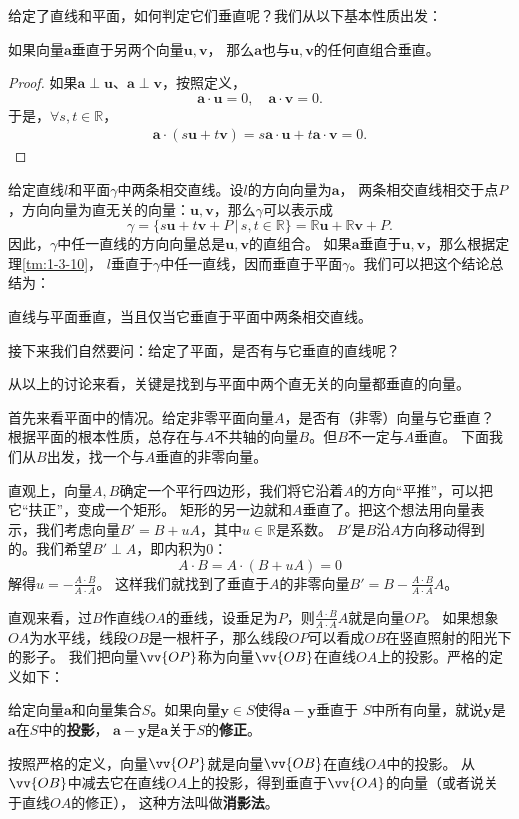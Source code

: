 \documentclass[12pt,UTF8,fontset=none]{ctexbook}
\begin{document}
给定了直线和平面，如何判定它们垂直呢？我们从以下基本性质出发：
\begin{tm}\label{tm:1-3-10}
    如果向量$\mathbf{a}$垂直于另两个向量$\mathbf{u},\mathbf{v}$，
    那么$\mathbf{a}$也与$\mathbf{u},\mathbf{v}$的任何直组合垂直。
\end{tm}
\begin{proof}
    如果$\mathbf{a}\perp \mathbf{u}$、$\mathbf{a}\perp \mathbf{v}$，按照定义，
    $$ \mathbf{a}\cdot \mathbf{u} = 0, \quad \mathbf{a}\cdot \mathbf{v} = 0. $$
    于是，$\forall s, t\in\mathbb{R}$，
    \begin{align*}
        \mathbf{a}\cdot (s\mathbf{u} + t\mathbf{v}) = s\mathbf{a}\cdot \mathbf{u} + t\mathbf{a}\cdot \mathbf{v} = 0. 
    \end{align*}
\end{proof}

给定直线$l$和平面$\gamma$中两条相交直线。设$l$的方向向量为$\mathbf{a}$，
两条相交直线相交于点$P$，方向向量为直无关的向量：$\mathbf{u},\mathbf{v}$，那么$\gamma$可以表示成
$$ \gamma = \{s\mathbf{u} + t\mathbf{v} + P \, | \, s,t\in\mathbb{R}\} = \mathbb{R}\mathbf{u} + \mathbb{R}\mathbf{v} + P. $$
因此，$\gamma$中任一直线的方向向量总是$\mathbf{u},\mathbf{v}$的直组合。
如果$\mathbf{a}$垂直于$\mathbf{u},\mathbf{v}$，那么根据定理\ref{tm:1-3-10}，
$l$垂直于$\gamma$中任一直线，因而垂直于平面$\gamma$。我们可以把这个结论总结为：
\begin{tm}\label{tm:1-3-20}
    直线与平面垂直，当且仅当它垂直于平面中两条相交直线。
\end{tm}
接下来我们自然要问：给定了平面，是否有与它垂直的直线呢？

从以上的讨论来看，关键是找到与平面中两个直无关的向量都垂直的向量。

首先来看平面中的情况。给定非零平面向量$A$，是否有（非零）向量与它垂直？
根据平面的根本性质，总存在与$A$不共轴的向量$B$。但$B$不一定与$A$垂直。
下面我们从$B$出发，找一个与$A$垂直的非零向量。

直观上，向量$A,B$确定一个平行四边形，我们将它沿着$A$的方向“平推”，可以把它“扶正”，变成一个矩形。
矩形的另一边就和$A$垂直了。把这个想法用向量表示，我们考虑向量$B' = B + uA$，其中$u\in\mathbb{R}$是系数。
$B'$是$B$沿$A$方向移动得到的。我们希望$B'\perp A$，即内积为$0$：
$$ A\cdot B = A\cdot (B + uA) = 0$$
解得$u = -\frac{A\cdot B}{A\cdot A}$。
这样我们就找到了垂直于$A$的非零向量$B' = B -\frac{A\cdot B}{A\cdot A}A$。

直观来看，过$B$作直线$OA$的垂线，设垂足为$P$，则$\frac{A\cdot B}{A\cdot A}A$就是向量$OP$。
如果想象$OA$为水平线，线段$OB$是一根杆子，那么线段$OP$可以看成$OB$在竖直照射的阳光下的影子。
我们把向量$\vv{OP}$称为向量$\vv{OB}$在直线$OA$上的投影。严格的定义如下：
\begin{df}\label{df:1-3-20}
    给定向量$\mathbf{a}$和向量集合$S$。如果向量$\mathbf{y}\in S$使得$\mathbf{a} - \mathbf{y}$垂直于
    $S$中所有向量，就说$\mathbf{y}$是$\mathbf{a}$在$S$中的\textbf{投影}，
    $\mathbf{a} - \mathbf{y}$是$\mathbf{a}$关于$S$的\textbf{修正}。
\end{df}
按照严格的定义，向量$\vv{OP}$就是向量$\vv{OB}$在直线$OA$中的投影。
从$\vv{OB}$中减去它在直线$OA$上的投影，得到垂直于$\vv{OA}$的向量（或者说关于直线$OA$的修正），
这种方法叫做\textbf{消影法}。
\end{document}
